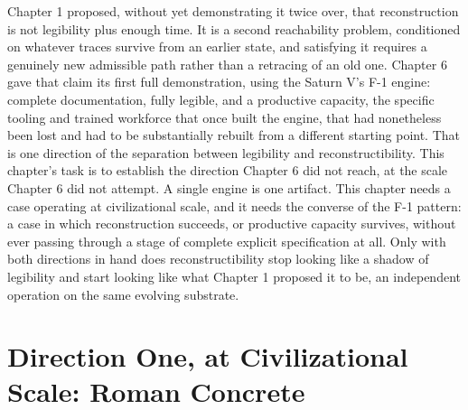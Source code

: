 \documentclass[11pt]{book}
\begin{document}
Chapter 1 proposed, without yet demonstrating it twice over, that reconstruction is not legibility plus enough time. It is a second reachability problem, conditioned on whatever traces survive from an earlier state, and satisfying it requires a genuinely new admissible path rather than a retracing of an old one. Chapter 6 gave that claim its first full demonstration, using the Saturn V's F-1 engine: complete documentation, fully legible, and a productive capacity, the specific tooling and trained workforce that once built the engine, that had nonetheless been lost and had to be substantially rebuilt from a different starting point. That is one direction of the separation between legibility and reconstructibility. This chapter's task is to establish the direction Chapter 6 did not reach, at the scale Chapter 6 did not attempt. A single engine is one artifact. This chapter needs a case operating at civilizational scale, and it needs the converse of the F-1 pattern: a case in which reconstruction succeeds, or productive capacity survives, without ever passing through a stage of complete explicit specification at all. Only with both directions in hand does reconstructibility stop looking like a shadow of legibility and start looking like what Chapter 1 proposed it to be, an independent operation on the same evolving substrate.

\section{Direction One, at Civilizational Scale: Roman Concrete}
\end{document}
